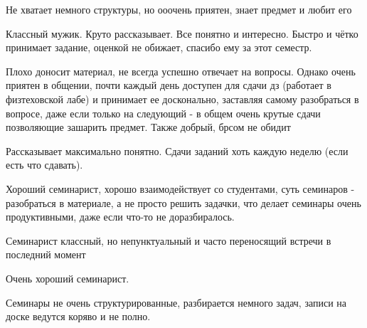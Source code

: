         \begin{commentbox} 
            Не хватает немного структуры, но ооочень приятен, знает предмет и любит его
        \end{commentbox} 
    
        \begin{commentbox} 
            Классный мужик. Круто рассказывает. Все понятно и интересно. Быстро и чётко принимает задание, оценкой не обижает, спасибо ему за этот семестр. 
        \end{commentbox} 
    
        \begin{commentbox} 
            Плохо доносит материал, не всегда успешно  отвечает на вопросы. Однако очень приятен в общении, почти каждый день доступен для сдачи дз (работает в физтеховской лабе) и принимает ее досконально, заставляя самому разобраться в вопросе, даже если только на следующий - в общем очень крутые сдачи позволяющие зашарить предмет. Также добрый, брсом не обидит
        \end{commentbox} 
    
        \begin{commentbox} 
            Рассказывает максимально понятно. Сдачи заданий хоть каждую неделю (если есть что сдавать).  
        \end{commentbox} 
    
        \begin{commentbox} 
            Хороший семинарист, хорошо взаимодействует со студентами, суть семинаров - разобраться в материале, а не просто решить задачки, что делает семинары очень продуктивными, даже если что-то не доразбиралось. 
        \end{commentbox} 
    
        \begin{commentbox} 
            Семинарист классный, но непунктуальный и часто переносящий встречи в последний момент 
        \end{commentbox} 
    
        \begin{commentbox} 
            Очень хороший семинарист. 
        \end{commentbox} 
    
        \begin{commentbox} 
            Семинары не очень структурированные, разбирается немного задач, записи на доске ведутся коряво и не полно. 
        \end{commentbox} 
    
